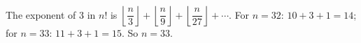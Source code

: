 The exponent of $3$ in $n!$ is $\left\lfloor\dfrac {n}{3}\right\rfloor+\left\lfloor\dfrac {n}{9}\right\rfloor+\left\lfloor\dfrac {n}{27}\right\rfloor+\cdots$. For $n=32$: $10+3+1=14$; for $n=33$: $11+3+1=15$. So $n=\boxed{33}$.
